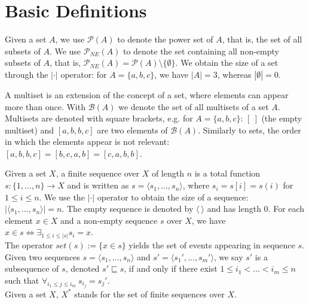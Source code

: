 \section{Basic Definitions}

\begin{definition}
Given a set $A$, we use $\mathcal{P}(A)$ to denote the power set of $A$, that is, the set of all subsets of $A$.
We use $\mathcal{P}_{NE}(A)$ to denote the set containing all non-empty subsets of $A$, that is, $\mathcal{P}_{NE}(A)=\mathcal{P}(A) \setminus \{\emptyset \}$.
We obtain the size of a set through the $|\cdot|$ operator: for $A=\{a,b,c\}$, we have $|A| = 3$, whereas $|\emptyset|=0$.
\end{definition}


\begin{definition}[Multiset]
A multiset is an extension of the concept of a set, where elements can appear more than once. 
With $\mathcal{B}(A)$ we denote the set of all multisets of a set $A$.
Multisets are denoted with square brackets, e.g. for $A=\{a,b,c\}$: $[~]$ (the empty multiset) and $[a,b,b,c]$ are two elements of $\mathcal{B}(A)$.
Similarly to sets, the order in which the elements appear is not relevant: $[a,b,b,c] = [b,c,a,b] = [c,a,b,b]$.
\end{definition}


\begin{definition}
Given a set $X$, a finite sequence over $X$ of length $n$ is a total function $s: \{1,...,n\} \rightarrow X$ and is written as $s = \langle s_1,...,s_n \rangle$, where $s_i = s[i] = s(i)$ for $1 \leq i \leq n$.
We use the $|\cdot|$ operator to obtain the size of a sequence: $|\langle s_1,...,s_n \rangle| = n$.
The empty sequence is denoted by $\langle ~ \rangle$ and has length 0.
For each element $x \in X$ and a non-empty sequence $s$ over $X$, we have $x \in s \Leftrightarrow \exists_{1\leq i \leq |s|} s_i=x$.\\
The operator $set(s) :=\{x \in s \}$ yields the set of events appearing in sequence $s$.\\
Given two sequences $s=\langle s_1,...,s_n \rangle$ and $s'=\langle s_1',...,s_m' \rangle$, we say $s'$ is a subsequence of $s$, denoted $s' \sqsubseteq s$, if and only if there exist $1 \leq i_1 < ... < i_m \leq n$ such that $\forall_{i_1 \leq j \leq i_m} ~s_{i_j} = s_j'$. \\
Given a set $X$, $X^*$ stands for the set of finite sequences over $X$.
\end{definition}


